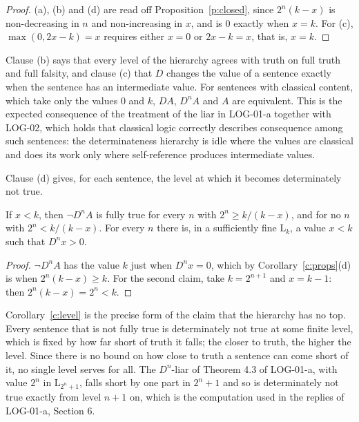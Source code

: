 \documentclass{situationist-preprint}
\begin{document}
\begin{proof}
(a), (b) and (d) are read off Proposition~\ref{p:closed}, since $2^n(k-x)$ is non-decreasing in $n$ and non-increasing in $x$, and is $0$ exactly when $x = k$. For (c), $\max(0, 2x - k) = x$ requires either $x = 0$ or $2x - k = x$, that is, $x = k$.
\end{proof}

Clause (b) says that every level of the hierarchy agrees with truth on full truth and full falsity, and clause (c) that $D$ changes the value of a sentence exactly when the sentence has an intermediate value. For sentences with classical content, which take only the values $0$ and $k$, $DA$, $D^nA$ and $A$ are equivalent. This is the expected consequence of the treatment of the liar in LOG-01-a together with LOG-02, which holds that classical logic correctly describes consequence among such sentences: the determinateness hierarchy is idle where the values are classical and does its work only where self-reference produces intermediate values.

Clause (d) gives, for each sentence, the level at which it becomes determinately not true.

\begin{corollary}\label{c:level}
If $x < k$, then $\neg D^n A$ is fully true for every $n$ with $2^n \geq k/(k-x)$, and for no $n$ with $2^n < k/(k - x)$. For every $n$ there is, in a sufficiently fine $\mathrm{L}_k$, a value $x < k$ such that $D^n x > 0$.
\end{corollary}

\begin{proof}
$\neg D^n A$ has the value $k$ just when $D^n x = 0$, which by Corollary~\ref{c:props}(d) is when $2^n(k-x) \geq k$. For the second claim, take $k = 2^{n+1}$ and $x = k - 1$: then $2^n(k - x) = 2^n < k$.
\end{proof}

Corollary~\ref{c:level} is the precise form of the claim that the hierarchy has no top. Every sentence that is not fully true is determinately not true at some finite level, which is fixed by how far short of truth it falls; the closer to truth, the higher the level. Since there is no bound on how close to truth a sentence can come short of it, no single level serves for all. The $D^n$-liar of Theorem 4.3 of LOG-01-a, with value $2^n$ in $\mathrm{L}_{2^n+1}$, falls short by one part in $2^n + 1$ and so is determinately not true exactly from level $n+1$ on, which is the computation used in the replies of LOG-01-a, Section 6.
\end{document}
